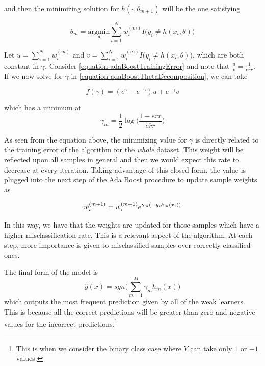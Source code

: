 and then the minimizing solution for $h(\cdot, \theta_{m+1})$ will be the one satisfying

\begin{equation}\label{equation-adaBoostThetaMinimization}
\theta_{m} = \underset{ \theta}{\mathrm{argmin}} \sum_{i=1}^{N} w_i^{(m)} I \big( y_i \neq h(x_i,\theta)  \big)
\end{equation}

Let $u = \sum_{i=1}^{N} w_i^{(m)}$ and $v = \sum_{i=1}^{N} w_i^{(m)} I \big( y_i \neq h(x_i,\theta)  \big) $, which are both constant in $\gamma$. Consider \cref{equation-adaBoostTrainingError} and note that $\frac{u}{v} = \frac{1}{\overline{err}}$. If we now solve for $\gamma$ in \cref{equation-adaBoostThetaDecomposition}, we can take

\begin{equation}\label{equation-adaBoostBetaMinimization}
f(\gamma) = ( e^{\gamma} - e^{-\gamma}) u + e^{-\gamma}v
\end{equation}

which has a minimum at
\begin{equation}
\gamma_{m} = \frac{1}{2} \log\big( \frac{1 - \overline{err} }{ \overline{err} } \big)
\end{equation}

As seen from the equation above, the minimizing value for $\gamma$ is directly related to the training error of the algorithm for the \textit{whole} dataset. This weight will be reflected upon all samples in general and then we would expect this rate to decrease at every iteration. Taking advantage of this closed form, the value is plugged into the next step of the Ada Boost procedure to update sample weights as

\begin{equation}
w_i^{(m+1)} =  w_i^{(m+1)} e^{\gamma_m(-y_i h_m(x_i))} \\
\end{equation}

In this way, we have that the weights are updated for those samples which have a higher misclassification rate. This is a relevant aspect of the algorithm. At each step, more importance is given to misclassified samples over correctly classified ones.



The final form of the model is
\begin{equation}
 \hat{y}(x) = sgn\big( \sum_{m=1}^{M} \gamma_m h_m(x) \big)
\end{equation}
  which outputs the most frequent prediction given by all of the weak learners. This is because all the correct predictions will be greater than zero and negative values for the incorrect predictions.\footnote{This is when we consider the binary class case where $Y$ can take only $1$ or $-1$ values.}

